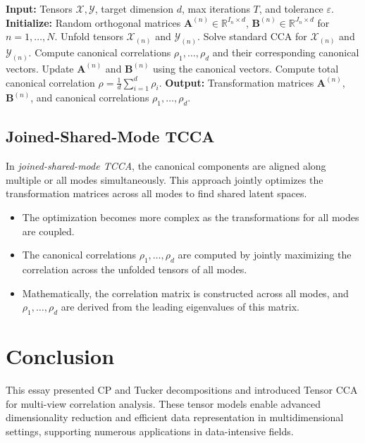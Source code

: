\documentclass[a4paper,14pt]{article}
\renewcommand{\epsilon}{\ensuremath{\varepsilon}}
\theoremstyle{plain} %
\theoremstyle{definition} %
\theoremstyle{remark} %
\theoremstyle{definition}
\theoremstyle{remark}
\theoremstyle{remark}
\begin{document}
	\begin{algorithm}
		\caption{Single-Shared-Mode Tensor CCA Algorithm}
		\label{alg:single_shared_mode_tcca}
		\begin{algorithmic}[1]
			\State \textbf{Input:} Tensors \( \mathcal{X}, \mathcal{Y} \), target dimension \( d \), max iterations \( T \), and tolerance \( \epsilon \).
			\State \textbf{Initialize:} Random orthogonal matrices \( \mathbf{A}^{(n)} \in \mathbb{R}^{I_n \times d} \), \( \mathbf{B}^{(n)} \in \mathbb{R}^{J_n \times d} \) for \( n = 1, \ldots, N \).
			\Repeat
			\State Unfold tensors \( \mathcal{X}_{(n)} \) and \( \mathcal{Y}_{(n)} \).
			\State Solve standard CCA for \( \mathcal{X}_{(n)} \) and \( \mathcal{Y}_{(n)} \).
			\State Compute canonical correlations \( \rho_1, \ldots, \rho_d \) and their corresponding canonical vectors.
			\State Update \( \mathbf{A}^{(n)} \) and \( \mathbf{B}^{(n)} \) using the canonical vectors.
			\EndFor
			\State Compute total canonical correlation \( \rho = \frac{1}{d} \sum_{i=1}^d \rho_i \).
			\State \textbf{Output:} Transformation matrices \( \mathbf{A}^{(n)} \), \( \mathbf{B}^{(n)} \), and canonical correlations \( \rho_1, \ldots, \rho_d \).
		\end{algorithmic}
	\end{algorithm}
	
	\subsection{Joined-Shared-Mode TCCA}
	
	In \textit{joined-shared-mode TCCA}, the canonical components are aligned along multiple or all modes simultaneously. This approach jointly optimizes the transformation matrices across all modes to find shared latent spaces.
	
	\begin{itemize}
		\item The optimization becomes more complex as the transformations for all modes are coupled.
		\item The canonical correlations \( \rho_1, \ldots, \rho_d \) are computed by jointly maximizing the correlation across the unfolded tensors of all modes.
		\item Mathematically, the correlation matrix is constructed across all modes, and \( \rho_1, \ldots, \rho_d \) are derived from the leading eigenvalues of this matrix.
	\end{itemize}

	\section{Conclusion}
	This essay presented CP and Tucker decompositions and introduced Tensor CCA for multi-view correlation analysis. These tensor models enable advanced dimensionality reduction and efficient data representation in multidimensional settings, supporting numerous applications in data-intensive fields.
	
	\nocite{*}
	\printbibliography
	
\end{document}
